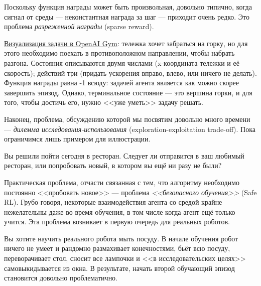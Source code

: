 Поскольку функция награды может быть произвольная, довольно типично, когда сигнал от среды --- неконстантная награда за шаг --- приходит очень редко. Это проблема \emph{разреженной награды} (sparse reward).

\begin{example}
\href{https://gym.openai.com/envs/MountainCar-v0/}{Визуализация задачи в OpenAI Gym}: тележка хочет забраться на горку, но для этого необходимо поехать в противоположном направлении, чтобы набрать разгона. Состояния описываются двумя числами (x-координата тележки и её скорость); действий три (придать ускорения вправо, влево, или ничего не делать). Функция награды равна -1 всюду: задачей агента является как можно скорее завершить эпизод. Однако, терминальное состояние --- это вершина горки, и для того, чтобы достичь его, нужно <<уже уметь>> задачу решать.  
\end{example}

Наконец, проблема, обсуждению которой мы посвятим довольно много времени --- \emph{дилемма исследования-использования} (exploration-exploitation trade-off). Пока ограничимся лишь примером для иллюстрации.

\begin{example}
Вы решили пойти сегодня в ресторан. Следует ли отправится в ваш любимый ресторан, или попробовать новый, в котором вы ещё ни разу не были?
\end{example}

Практическая проблема, отчасти связанная с тем, что алгоритму необходимо постоянно <<пробовать новое>> --- проблема \emph{<<безопасного обучения>>} (Safe RL). Грубо говоря, некоторые взаимодействия агента со средой крайне нежелательны даже во время обучения, в том числе когда агент ещё только учится. Эта проблема возникает в первую очередь для реальных роботов.

\begin{example}
Вы хотите научить реального робота мыть посуду. В начале обучения робот ничего не умеет и рандомно размахивает конечностями, бьёт всю посуду, переворачивает стол, сносит все лампочки и <<в исследовательских целях>> самовыкидывается из окна. В результате, начать второй обучающий эпизод становится довольно проблематично.
\end{example}

